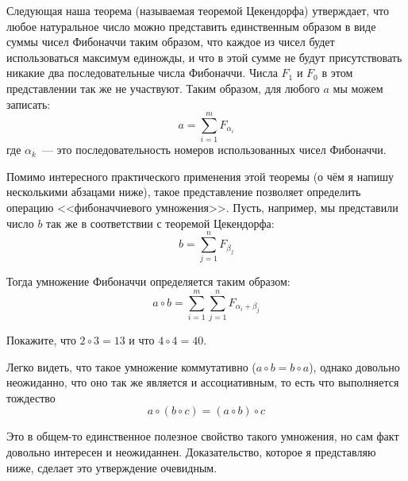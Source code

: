 Следующая наша теорема (называемая теоремой Цекендорфа) утверждает, что любое натуральное число можно представить единственным образом в виде суммы чисел Фибоначчи таким образом, что каждое из чисел будет использоваться максимум единожды, и что в этой сумме не будут присутствовать никакие два последовательные числа Фибоначчи. Числа $F_1$ и $F_0$ в этом представлении так же не участвуют. Таким образом, для любого $a$ мы можем записать:
\begin{equation}\label{non:1}
a = \sum_{i=1}^m F_{\alpha_i}
\end{equation}
где $\alpha_k$~--- это последовательность номеров использованных чисел Фибоначчи.

Помимо интересного практического применения этой теоремы (о чём я напишу несколькими абзацами ниже), такое представление позволяет определить операцию <<фибоначчиевого умножения>>. Пусть, например, мы представили число $b$ так же в соответствии с теоремой Цекендорфа:
$$b = \sum_{j=1}^n F_{\beta_j}$$

Тогда умножение Фибоначчи определяется таким образом:
$$a\circ b = \sum_{i=1}^m\sum_{j=1}^n F_{\alpha_i+\beta_j}$$

\begin{exercise}
Покажите, что $2\circ3 = 13$ и что $4\circ4 = 40$.
\end{exercise}

Легко видеть, что такое умножение коммутативно ($a\circ b = b\circ a$), однако довольно неожиданно, что оно так же является и ассоциативным, то есть что выполняется тождество
$$a\circ(b\circ c) = (a\circ b)\circ c$$

Это в общем-то единственное полезное свойство такого умножения, но сам факт довольно интересен и неожиданнен. Доказательство, которое я представляю ниже, сделает это утверждение очевидным.

